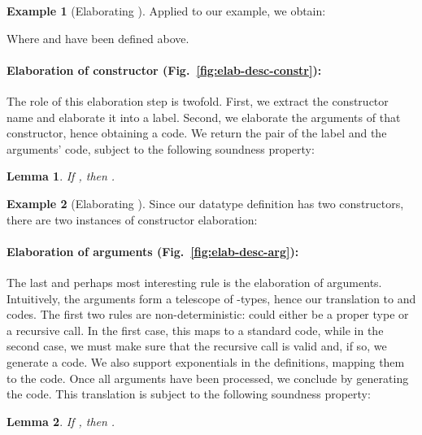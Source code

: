 \documentclass{scrartcl}
\theoremstyle{plain}
\newtheorem{lemma}{Lemma}
\theoremstyle{definition}
\newtheorem{example}{Example}
\begin{document}
\begin{example}[Elaborating ]

Applied to our example, we obtain:

Where  and  have been defined
above.

\end{example}




\paragraph{Elaboration of constructor (Fig.~\ref{fig:elab-desc-constr}):}
The role of this elaboration step is twofold. First, we extract the
constructor name and elaborate it into a label. Second, we elaborate
the arguments of that constructor, hence obtaining a 
code. We return the pair of the label and the arguments' code, subject
to the following soundness property:
\begin{lemma}\label{lemma:elab-desc-constr}
If 
, then
.

\end{lemma}

\begin{example}[Elaborating ]

Since our datatype definition has two constructors, there are two
instances of constructor elaboration:


\end{example}




\paragraph{Elaboration of arguments (Fig.~\ref{fig:elab-desc-arg}):}
The last and perhaps most interesting rule is the elaboration of
arguments. Intuitively, the arguments form a telescope of
-types, hence our translation to  and 
codes. The first two rules are non-deterministic:  could either
be a proper type or a recursive call. In the first case, this maps to
a standard  code, while in the second case, we must make
sure that the recursive call is valid and, if so, we generate a
 code. We also support exponentials in the definitions,
mapping them to the  code. Once all arguments have been
processed, we conclude by generating the  code. This
translation is subject to the following soundness property:
\begin{lemma}\label{lemma:elab-desc-arg}
If 
, then
.
\end{lemma}
\end{document}
